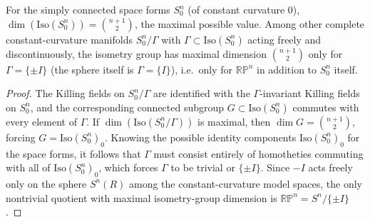 \begin{remark}
  \label{rem:pet-ch8-max-isometry-space-forms}
  For the simply connected space forms $S^n_0$ (of constant curvature $0$),
  $\dim(\mathrm{Iso}(S^n_0))=\binom{n+1}2$, the maximal possible value. Among
  other complete constant-curvature manifolds $S^n_0/\Gamma$ with
  $\Gamma\subset\mathrm{Iso}(S^n_0)$ acting freely and discontinuously, the
  isometry group has maximal dimension $\binom{n+1}2$ only for
  $\Gamma=\{\pm I\}$ (the sphere itself is $\Gamma=\{I\}$), i.e.\ only for
  $\mathbb{RP}^n$ in addition to $S^n_0$ itself.
\end{remark}
\begin{proof}
  The Killing fields on $S^n_0/\Gamma$ are identified with the
  $\Gamma$-invariant Killing fields on $S^n_0$, and the corresponding connected
  subgroup $G\subset\mathrm{Iso}(S^n_0)$ commutes with every element of
  $\Gamma$. If $\dim(\mathrm{Iso}(S^n_0/\Gamma))$ is maximal, then $\dim G=\binom{n+1}2$,
  forcing $G=\mathrm{Iso}(S^n_0)_0$. Knowing the possible identity components
  $\mathrm{Iso}(S^n_0)_0$ for the space forms, it follows that $\Gamma$ must
  consist entirely of homotheties commuting with all of $\mathrm{Iso}(S^n_0)_0$,
  which forces $\Gamma$ to be trivial or $\{\pm I\}$. Since $-I$ acts freely
  only on the sphere $S^n(R)$ among the constant-curvature model spaces, the
  only nontrivial quotient with maximal isometry-group dimension is
  $\mathbb{RP}^n=S^n/\{\pm I\}$.
\end{proof}

